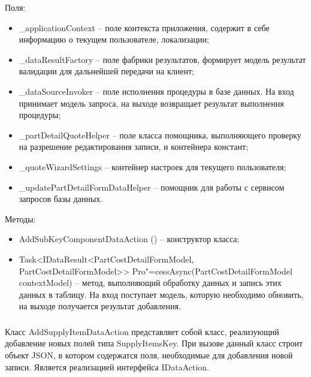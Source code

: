 Поля:
\begin{itemize}
  \item \_applicationContext – поле контекста приложения, содержит в себе информацию о текущем пользователе, локализации;
  \item \_dataResultFactory – поле фабрики результатов, формирует модель результат валидации для дальнейшей передачи на клиент;
  \item \_dataSourceInvoker – поле исполнения процедуры в базе данных. На вход принимает модель запроса, на выходе возвращает результат выполнения процедуры;
  \item \_partDetailQuoteHelper – поле класса помощника, выполняющего проверку на разрешение редактирования записи, и контейнера констант;
  \item \_quoteWizardSettings – контейнер настроек для текущего пользователя;
  \item \_updatePartDetailFormDataHelper – помощник для работы с сервисом запросов базы данных.
\end{itemize}

Методы:
\begin{itemize}
  \item AddSubKeyComponentDataAction () – конструктор класса;
  \item Task<IDataResult<PartCostDetailFormModel, PartCostDetailFormModel>> Pro"=cessAsync(PartCostDetailFormModel contextModel) – метод, выполняющий обработку данных и запись этих данных в таблицу. На вход поступает модель, которую необходимо обновить, на выходе получается результат добавления.
\end{itemize}

\subsubsection{}
\label{sub:arch_and_mod:data_layer:add_supply_item}

Класс AddSupplyItemDataAction представляет собой класс, реализующий добавление новых полей типа SupplyItemsKey. При вызове данный класс строит объект JSON, в котором содержатся поля, необходимые для добавления новой записи. Является реализацией интерфейса IDataAction.

